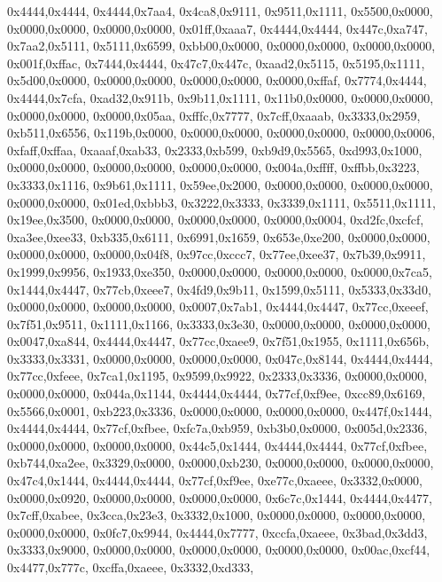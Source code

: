 {	0x4444,0x4444,
	0x4444,0x7aa4,
	0x4ca8,0x9111,
	0x9511,0x1111,
	0x5500,0x0000,
	0x0000,0x0000,
	0x0000,0x0000,
	0x01ff,0xaaa7,
	0x4444,0x4444,
	0x447c,0xa747,
	0x7aa2,0x5111,
	0x5111,0x6599,
	0xbb00,0x0000,
	0x0000,0x0000,
	0x0000,0x0000,
	0x001f,0xffac,
	0x7444,0x4444,
	0x47c7,0x447c,
	0xaad2,0x5115,
	0x5195,0x1111,
	0x5d00,0x0000,
	0x0000,0x0000,
	0x0000,0x0000,
	0x0000,0xffaf,
	0x7774,0x4444,
	0x4444,0x7cfa,
	0xad32,0x911b,
	0x9b11,0x1111,
	0x11b0,0x0000,
	0x0000,0x0000,
	0x0000,0x0000,
	0x0000,0x05aa,
	0xfffc,0x7777,
	0x7cff,0xaaab,
	0x3333,0x2959,
	0xb511,0x6556,
	0x119b,0x0000,
	0x0000,0x0000,
	0x0000,0x0000,
	0x0000,0x0006,
	0xfaff,0xffaa,
	0xaaaf,0xab33,
	0x2333,0xb599,
	0xb9d9,0x5565,
	0xd993,0x1000,
	0x0000,0x0000,
	0x0000,0x0000,
	0x0000,0x0000,
	0x004a,0xffff,
	0xffbb,0x3223,
	0x3333,0x1116,
	0x9b61,0x1111,
	0x59ee,0x2000,
	0x0000,0x0000,
	0x0000,0x0000,
	0x0000,0x0000,
	0x01ed,0xbbb3,
	0x3222,0x3333,
	0x3339,0x1111,
	0x5511,0x1111,
	0x19ee,0x3500,
	0x0000,0x0000,
	0x0000,0x0000,
	0x0000,0x0004,
	0xd2fc,0xcfcf,
	0xa3ee,0xee33,
	0xb335,0x6111,
	0x6991,0x1659,
	0x653e,0xe200,
	0x0000,0x0000,
	0x0000,0x0000,
	0x0000,0x04f8,
	0x97cc,0xccc7,
	0x77ee,0xee37,
	0x7b39,0x9911,
	0x1999,0x9956,
	0x1933,0xe350,
	0x0000,0x0000,
	0x0000,0x0000,
	0x0000,0x7ca5,
	0x1444,0x4447,
	0x77cb,0xeee7,
	0x4fd9,0x9b11,
	0x1599,0x5111,
	0x5333,0x33d0,
	0x0000,0x0000,
	0x0000,0x0000,
	0x0007,0x7ab1,
	0x4444,0x4447,
	0x77cc,0xeeef,
	0x7f51,0x9511,
	0x1111,0x1166,
	0x3333,0x3e30,
	0x0000,0x0000,
	0x0000,0x0000,
	0x0047,0xa844,
	0x4444,0x4447,
	0x77cc,0xaee9,
	0x7f51,0x1955,
	0x1111,0x656b,
	0x3333,0x3331,
	0x0000,0x0000,
	0x0000,0x0000,
	0x047c,0x8144,
	0x4444,0x4444,
	0x77cc,0xfeee,
	0x7ca1,0x1195,
	0x9599,0x9922,
	0x2333,0x3336,
	0x0000,0x0000,
	0x0000,0x0000,
	0x044a,0x1144,
	0x4444,0x4444,
	0x77cf,0xf9ee,
	0xcc89,0x6169,
	0x5566,0x0001,
	0xb223,0x3336,
	0x0000,0x0000,
	0x0000,0x0000,
	0x447f,0x1444,
	0x4444,0x4444,
	0x77cf,0xfbee,
	0xfc7a,0xb959,
	0xb3b0,0x0000,
	0x005d,0x2336,
	0x0000,0x0000,
	0x0000,0x0000,
	0x44c5,0x1444,
	0x4444,0x4444,
	0x77cf,0xfbee,
	0xb744,0xa2ee,
	0x3329,0x0000,
	0x0000,0xb230,
	0x0000,0x0000,
	0x0000,0x0000,
	0x47c4,0x1444,
	0x4444,0x4444,
	0x77cf,0xf9ee,
	0xe77c,0xaeee,
	0x3332,0x0000,
	0x0000,0x0920,
	0x0000,0x0000,
	0x0000,0x0000,
	0x6c7c,0x1444,
	0x4444,0x4477,
	0x7cff,0xabee,
	0x3cca,0x23e3,
	0x3332,0x1000,
	0x0000,0x0000,
	0x0000,0x0000,
	0x0000,0x0000,
	0x0fc7,0x9944,
	0x4444,0x7777,
	0xccfa,0xaeee,
	0x3bad,0x3dd3,
	0x3333,0x9000,
	0x0000,0x0000,
	0x0000,0x0000,
	0x0000,0x0000,
	0x00ac,0xcf44,
	0x4477,0x777c,
	0xcffa,0xaeee,
	0x3332,0xd333,
}
